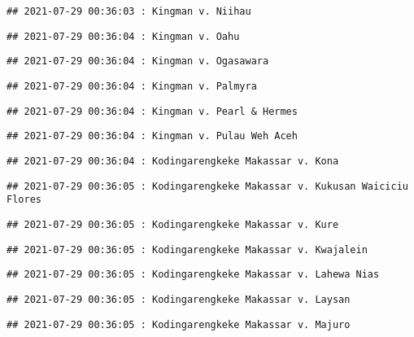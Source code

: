 \documentclass[
]{article}
\begin{document}
\begin{verbatim}
## 2021-07-29 00:36:03 : Kingman v. Niihau
\end{verbatim}

\begin{verbatim}
## 2021-07-29 00:36:04 : Kingman v. Oahu
\end{verbatim}

\begin{verbatim}
## 2021-07-29 00:36:04 : Kingman v. Ogasawara
\end{verbatim}

\begin{verbatim}
## 2021-07-29 00:36:04 : Kingman v. Palmyra
\end{verbatim}

\begin{verbatim}
## 2021-07-29 00:36:04 : Kingman v. Pearl & Hermes
\end{verbatim}

\begin{verbatim}
## 2021-07-29 00:36:04 : Kingman v. Pulau Weh Aceh
\end{verbatim}

\begin{verbatim}
## 2021-07-29 00:36:04 : Kodingarengkeke Makassar v. Kona
\end{verbatim}

\begin{verbatim}
## 2021-07-29 00:36:05 : Kodingarengkeke Makassar v. Kukusan Waiciciu Flores
\end{verbatim}

\begin{verbatim}
## 2021-07-29 00:36:05 : Kodingarengkeke Makassar v. Kure
\end{verbatim}

\begin{verbatim}
## 2021-07-29 00:36:05 : Kodingarengkeke Makassar v. Kwajalein
\end{verbatim}

\begin{verbatim}
## 2021-07-29 00:36:05 : Kodingarengkeke Makassar v. Lahewa Nias
\end{verbatim}

\begin{verbatim}
## 2021-07-29 00:36:05 : Kodingarengkeke Makassar v. Laysan
\end{verbatim}

\begin{verbatim}
## 2021-07-29 00:36:05 : Kodingarengkeke Makassar v. Majuro
\end{verbatim}
\end{document}
